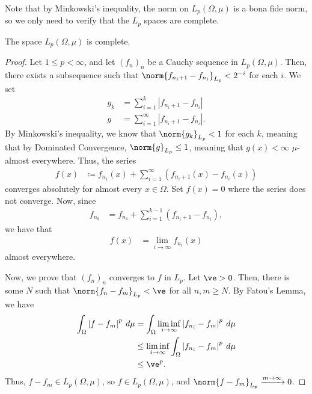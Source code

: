 \documentclass[10pt]{mypackage}
\begin{document}
Note that by Minkowski's inequality, the norm on $L_p\left( \Omega,\mu \right)$ is a bona fide norm, so we only need to verify that the $L_p$ spaces are complete.
\begin{theorem}
  The space $L_p\left( \Omega,\mu \right)$ is complete.
\end{theorem}
\begin{proof}
  Let $1 \leq p < \infty$, and let $\left( f_n \right)_n$ be a Cauchy sequence in $L_p\left( \Omega,\mu \right)$. Then, there exists a subsequence such that $\norm{f_{n_i + 1} - f_{n_i}}_{L_p} < 2^{-i}$ for each $i$. We set
  \begin{align*}
    g_k &= \sum_{i=1}^{k}\left\vert f_{n_i + 1} - f_{n_i} \right\vert\\
    g &= \sum_{i=1}^{\infty}\left\vert f_{n_i + 1} - f_{n_i} \right\vert.
  \end{align*}
  By Minkowski's inequality, we know that $\norm{g_k}_{L_p} < 1$ for each $k$, meaning that by Dominated Convergence, $\norm{g}_{L_p} \leq 1$, meaning that $g(x) < \infty$ $\mu$-almost everywhere. Thus, the series 
  \begin{align*}
    f(x) &\coloneq f_{n_1}(x) + \sum_{i=1}^{\infty}\left( f_{n_i + 1}\left( x \right) -  f_{n_i}\left( x \right)\right)
  \end{align*}
  converges absolutely for almost every $x\in \Omega$. Set $f(x) = 0$ where the series does not converge. Now, since
  \begin{align*}
    f_{n_k} &= f_{n_1} + \sum_{i=1}^{k-1}\left( f_{n_i + 1} - f_{n_i} \right),
  \end{align*}
  we have that
  \begin{align*}
    f(x) &= \lim_{i\rightarrow\infty}f_{n_i}(x)
  \end{align*}
  almost everywhere.\newline

  Now, we prove that $\left( f_n \right)_n$ converges to $f$ in $L_p$. Let $\ve > 0$. Then, there is some $N$ such that $\norm{f_n - f_m}_{L_p} < \ve$ for all $n,m \geq N$. By Fatou's Lemma, we have
  \begin{align*}
    \int_{\Omega}^{} \left\vert f-f_m \right\vert^{p}\:d\mu &= \int_{\Omega}^{} \liminf_{i\rightarrow\infty}\left\vert f_{n_i} - f_m \right\vert^{p}\:d\mu\\
                                                            &\leq \liminf_{i\rightarrow\infty}\int_{\Omega}^{} \left\vert f_{n_i} - f_m \right\vert^{p}\:d\mu\\
                                                            &\leq \ve^{p}.
  \end{align*}
  Thus, $f-f_m\in L_p\left( \Omega,\mu \right)$, so $f\in L_p\left( \Omega,\mu \right)$, and $\norm{f - f_m}_{L_p}\xrightarrow{m\rightarrow\infty} 0$.\newline


\end{proof}
\end{document}

